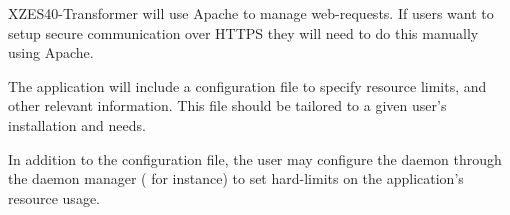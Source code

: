 XZES40-Transformer will use Apache to manage web-requests.
If users want to setup secure communication over HTTPS they will need to do this manually using Apache.

The application will include a configuration file to specify resource limits, and other relevant information.
This file should be tailored to a given user's installation and needs.

In addition to the configuration file, the user may configure the daemon through the daemon manager ( for instance) to set hard-limits on the application's resource usage.



